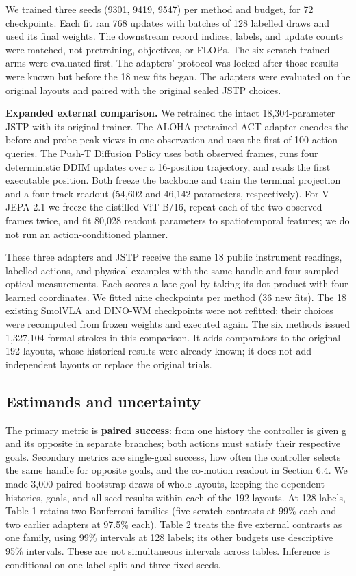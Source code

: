 \documentclass[11pt]{article}
\begin{document}
We trained three seeds (9301, 9419, 9547) per method and budget, for 72 checkpoints. Each fit ran 768 updates with batches of 128 labelled draws and used its final weights. The downstream record indices, labels, and update counts were matched, not pretraining, objectives, or FLOPs. The six scratch-trained arms were evaluated first. The adapters' protocol was locked after those results were known but before the 18 new fits began. The adapters were evaluated on the original layouts and paired with the original sealed JSTP choices.

\textbf{Expanded external comparison.} We retrained the intact 18,304-parameter JSTP with its original trainer. The ALOHA-pretrained ACT adapter encodes the before and probe-peak views in one observation and uses the first of 100 action queries. The Push-T Diffusion Policy uses both observed frames, runs four deterministic DDIM updates over a 16-position trajectory, and reads the first executable position. Both freeze the backbone and train the terminal projection and a four-track readout (54,602 and 46,142 parameters, respectively). For V-JEPA 2.1 we freeze the distilled ViT-B/16, repeat each of the two observed frames twice, and fit 80,028 readout parameters to spatiotemporal features; we do not run an action-conditioned planner.

These three adapters and JSTP receive the same 18 public instrument readings, labelled actions, and physical examples with the same handle and four sampled optical measurements. Each scores a late goal by taking its dot product with four learned coordinates. We fitted nine checkpoints per method (36 new fits). The 18 existing SmolVLA and DINO-WM checkpoints were not refitted: their choices were recomputed from frozen weights and executed again. The six methods issued 1,327,104 formal strokes in this comparison. It adds comparators to the original 192 layouts, whose historical results were already known; it does not add independent layouts or replace the original trials.

\subsection{Estimands and uncertainty}

The primary metric is \textbf{paired success}: from one history the controller is given g and its opposite in separate branches; both actions must satisfy their respective goals. Secondary metrics are single-goal success, how often the controller selects the same handle for opposite goals, and the co-motion readout in Section 6.4. We made 3,000 paired bootstrap draws of whole layouts, keeping the dependent histories, goals, and all seed results within each of the 192 layouts. At 128 labels, Table 1 retains two Bonferroni families (five scratch contrasts at 99\% each and two earlier adapters at 97.5\% each). Table 2 treats the five external contrasts as one family, using 99\% intervals at 128 labels; its other budgets use descriptive 95\% intervals. These are not simultaneous intervals across tables. Inference is conditional on one label split and three fixed seeds.
\end{document}
